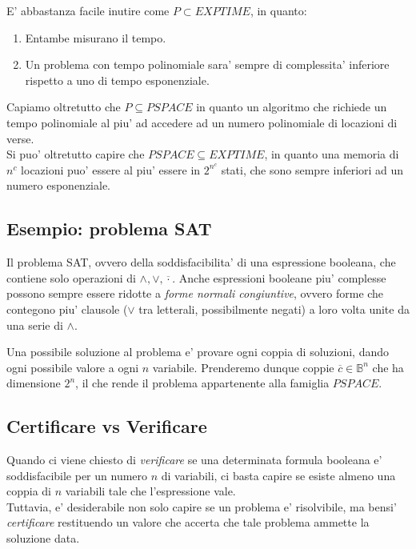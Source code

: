 \documentclass{article}
\begin{document}
E' abbastanza facile inutire come $P \subset EXPTIME$, in quanto:
\begin{enumerate}
  \item Entambe misurano il tempo.
  \item Un problema con tempo polinomiale sara' sempre di complessita'
    inferiore rispetto a uno di tempo esponenziale.
\end{enumerate}

\noindent Capiamo oltretutto che $P \subseteq PSPACE$ in quanto un algoritmo
che richiede un tempo polinomiale al piu' ad accedere ad un numero polinomiale
di locazioni di verse. \\
Si puo' oltretutto capire che $PSPACE \subseteq EXPTIME$, in quanto
una memoria di $n^c$ locazioni puo' essere al piu' essere in $2^{n^c}$ stati,
che sono sempre inferiori ad un numero esponenziale.

\subsection{Esempio: problema SAT}

Il problema SAT, ovvero della soddisfacibilita' di una espressione booleana, che
contiene solo operazioni di $\wedge, \vee, \overline{\cdot}$. Anche espressioni
booleane piu' complesse possono sempre essere ridotte a \emph{forme normali congiuntive},
ovvero forme che contegono piu' clausole ($\vee$ tra letterali, possibilmente negati)
a loro volta unite da una serie di $\wedge$.

Una possibile soluzione al problema e' provare ogni coppia di soluzioni, dando
ogni possibile valore a ogni $n$ variabile. Prenderemo dunque coppie $\overline{c}
\in \mathbb{B}^n$ che ha dimensione $2^n$, il che rende il problema appartenente
alla famiglia $PSPACE$.

\subsection{Certificare vs Verificare}

Quando ci viene chiesto di \emph{verificare} se una determinata formula booleana e'
soddisfacibile per un numero $n$ di variabili, ci basta capire se esiste almeno
una coppia di $n$ variabili tale che l'espressione vale. \\
Tuttavia, e' desiderabile non solo capire se un problema e' risolvibile, ma bensi'
\emph{certificare} restituendo un valore che accerta che tale problema ammette la soluzione data.
\end{document}
